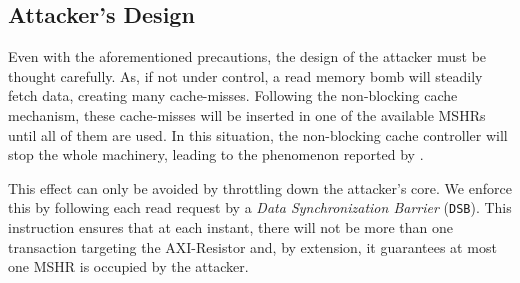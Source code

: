 %
%

    \subsection{Attacker's Design}
        \label{subsec:attacker_design}

        Even with the aforementioned precautions, the design of the attacker must be thought carefully. %
        As, if not under control, a read memory bomb will steadily fetch data, creating many cache-misses.
        Following the non-blocking cache mechanism, these cache-misses will be inserted in one of the available MSHRs until all of them are used.
        In this situation, the non-blocking cache controller will stop the whole machinery, leading to the phenomenon reported by \cite{Valsan2017AddressingIC}.

        This effect can only be avoided by throttling down the attacker's core.
        We enforce this by following each read request by a \emph{Data Synchronization Barrier} (\texttt{DSB}).
        This instruction ensures that at each instant, there will not be more than one transaction targeting the AXI-Resistor and, by extension, it guarantees at most one MSHR is occupied by the attacker.

